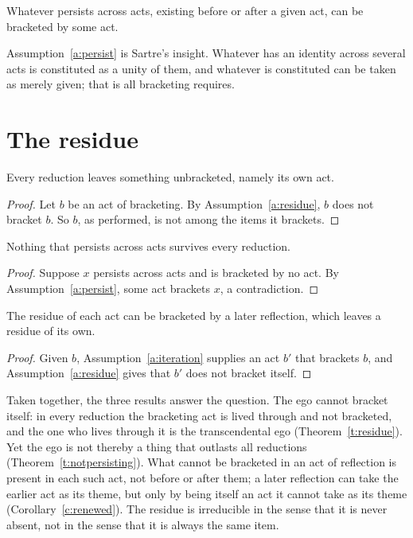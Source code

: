 \documentclass{situationist-preprint}
\begin{document}
\begin{assumption}\label{a:persist}
Whatever persists across acts, existing before or after a given act, can be bracketed by some act.
\end{assumption}

Assumption~\ref{a:persist} is Sartre's insight. Whatever has an identity across several acts is constituted as a unity of them, and whatever is constituted can be taken as merely given; that is all bracketing requires.

\section{The residue}

\begin{theorem}\label{t:residue}
Every reduction leaves something unbracketed, namely its own act.
\end{theorem}

\begin{proof}
Let $b$ be an act of bracketing. By Assumption~\ref{a:residue}, $b$ does not bracket $b$. So $b$, as performed, is not among the items it brackets.
\end{proof}

\begin{theorem}\label{t:notpersisting}
Nothing that persists across acts survives every reduction.
\end{theorem}

\begin{proof}
Suppose $x$ persists across acts and is bracketed by no act. By Assumption~\ref{a:persist}, some act brackets $x$, a contradiction.
\end{proof}

\begin{corollary}\label{c:renewed}
The residue of each act can be bracketed by a later reflection, which leaves a residue of its own.
\end{corollary}

\begin{proof}
Given $b$, Assumption~\ref{a:iteration} supplies an act $b'$ that brackets $b$, and Assumption~\ref{a:residue} gives that $b'$ does not bracket itself.
\end{proof}

Taken together, the three results answer the question. The ego cannot bracket itself: in every reduction the bracketing act is lived through and not bracketed, and the one who lives through it is the transcendental ego (Theorem~\ref{t:residue}). Yet the ego is not thereby a thing that outlasts all reductions (Theorem~\ref{t:notpersisting}). What cannot be bracketed in an act of reflection is present in each such act, not before or after them; a later reflection can take the earlier act as its theme, but only by being itself an act it cannot take as its theme (Corollary~\ref{c:renewed}). The residue is irreducible in the sense that it is never absent, not in the sense that it is always the same item.
\end{document}
